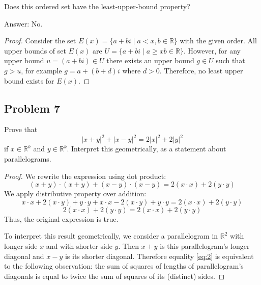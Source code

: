 \documentclass{article}
\begin{document}
\begin{tcolorbox}
Does this ordered set have the least-upper-bound
property? 
\end{tcolorbox}
Answer: No.

\begin{proof}
Consider the set $E(x) = \{ a+bi \mid a<x, b \in \mathbb{R} \}$ with the given order. All upper bounds of set $E(x)$ are $U = \{a+bi \mid a \geq x b \in \mathbb{R}\}$. However, for any upper bound $u = (a+bi) \in U$ there exists an upper bound $g \in U$ such that $g > u$, for example $g = a+(b+d)i$ where $d>0$. Therefore, no least upper bound exists for $E(x)$.
\end{proof}

\subsection*{Problem 7}

\begin{tcolorbox}
Prove that
\begin{equation} \label{eq:2}
|x + y|^2 + |x - y|^2 = 2|x|^2 + 2|y|^2    
\end{equation}
if $x \in \mathbb{R}^k$ and $y \in \mathbb{R}^k$. Interpret this geometrically, as a statement about parallelograms.
\end{tcolorbox}

\begin{proof}
We rewrite the expression using dot product:
$$(x+y) \cdot (x+y) + (x-y) \cdot (x-y) = 2 (x\cdot x) + 2 (y\cdot y)$$
We apply distributive property over addition:
$$ x \cdot x + 2(x \cdot y) + y \cdot y + x \cdot x - 2(x \cdot y) + y \cdot y = 2 (x \cdot x) + 2 (y\cdot y)$$
$$2 (x\cdot x) + 2 (y\cdot y) = 2 (x\cdot x) + 2 (y\cdot y)$$
Thus, the original expression is true.

To interpret this result geometrically, we consider a parallelogram in $\mathbb{R}^2$ with longer side $x$ and with shorter side $y$. Then $x+y$ is this parallelogram's longer diagonal and $x-y$ is its shorter diagonal. Therefore equality \ref{eq:2} is equivalent to the following observation: the sum of squares of lengths of parallelogram's diagonals is equal to twice the sum of squares of its (distinct) sides.

\end{proof}
\end{document}
